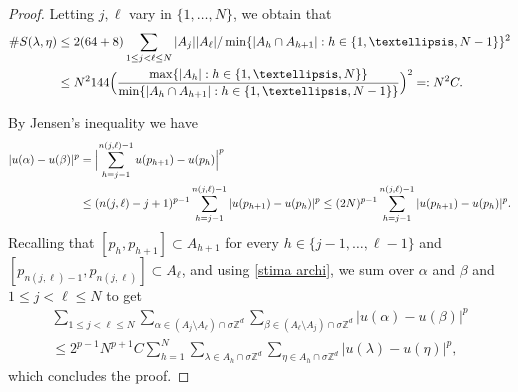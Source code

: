 \documentclass[10pt,a4paper]{amsart}
\def\ZZ{{\mathbb Z}}
\newcommand{\s}{\sigma}
\begin{document}
\begin{proof}
Letting $j,\ell$ vary in $\{1,\dots, N\}$, we obtain that
\begin{align} \notag
    \#S(\lambda,\eta) & \leq 2(64+8) \sum_{1\leq j<\ell\leq N} |A_j||A_\ell|/\min\{|A_h\cap A_{h+1}| :  h\in\{1,\dots, N-1\}\}^2 \\ \label{stima archi}
    & \leq N^2 144 \Bigl(\frac{\max\{|A_h|: h\in\{1,\dots, N\}\}}{\min\{|A_h\cap A_{h+1}| :  h\in\{1,\dots, N-1\}\}}\Bigr)^2=:N^2C.
\end{align}

By Jensen's inequality we have 
\begin{align*}
    |u(\alpha)-u(\beta)|^p &= \Bigl|\sum_{h=j-1}^{n(j,\ell)-1}u(p_{h+1})-u(p_h)\Bigr|^p \\
    &\leq (n(j,\ell)-j+1)^{p-1} \sum_{h=j-1}^{n(j,\ell)-1}|u(p_{h+1})-u(p_h)|^p \leq (2N)^{p-1}\sum_{h=j-1}^{n(j,\ell)-1}|u(p_{h+1})-u(p_h)|^p.
\end{align*}
Recalling that $[p_h,p_{h+1}]\subset A_{h+1}$ for every $h\in\{j-1,\dots, \ell-1\}$ and $[p_{n(j,\ell)-1},p_{n(j,\ell)}]\subset A_\ell$, and using \eqref{stima archi}, we sum over $\alpha$ and $\beta$ and $1\leq j<\ell\leq N$ to get 
\begin{multline*}
     \sum_{1\leq j<\ell\leq N}\sum_{\alpha\in (A_j\setminus A_\ell) \cap\s\ZZ^d}\sum_{\beta \in (A_\ell\setminus A_j)\cap\s\ZZ^d}|u(\alpha)-u(\beta)|^p \\ \leq 2^{p-1}N^{p+1}C \sum_{h=1}^{N}\sum_{\lambda\in A_h\cap \s \ZZ^d}\sum_{\eta\in A_h\cap \s \ZZ^d}|u(\lambda)-u(\eta)|^p,
\end{multline*}
which concludes the proof.
\end{proof}
\end{document}

